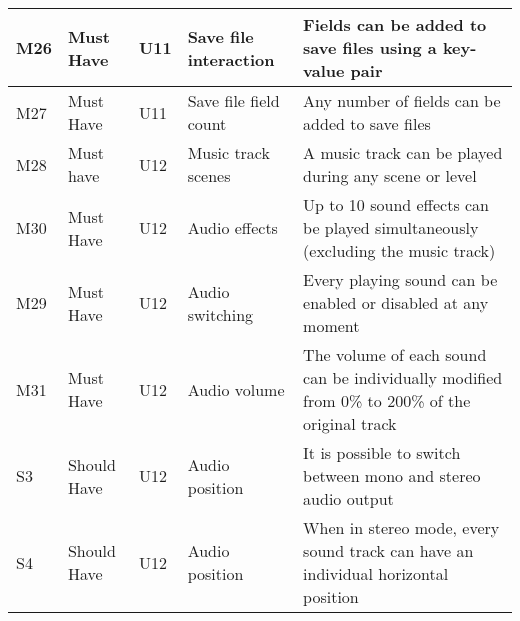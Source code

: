 \documentclass{article} %
\begin{document}
\begin{longtable}{|p{}|p{}|p{}|p{}|p{}|}
    M26                         & Must Have                          & U11                & Save file interaction       & Fields can be added to save files using a key-value pair                                                                                                    \\ \hline
    M27                         & Must Have                          & U11                & Save file field count       & Any number of fields can be added to save files                                                                                                             \\ \hline
    M28                         & Must have                          & U12                & Music track scenes          & A music track can be played during any scene or level                                                                                                       \\ \hline
    M30                         & Must Have                          & U12                & Audio effects               & Up to 10 sound effects can be played simultaneously (excluding the music track)                                                                             \\ \hline
    M29                         & Must Have                          & U12                & Audio switching             & Every playing sound can be enabled or disabled at any moment                                                                                                \\ \hline
    M31                         & Must Have                          & U12                & Audio volume                & The volume of each sound can be individually modified from 0\% to 200\% of the original track                                                               \\ \hline
    S3                          & Should Have                        & U12                & Audio position              & It is possible to switch between mono and stereo audio output                                                                                               \\ \hline
    S4                          & Should Have                        & U12                & Audio position              & When in stereo mode, every sound track can have an individual horizontal position                                                                           \\ \hline

\end{longtable}
\end{document}
